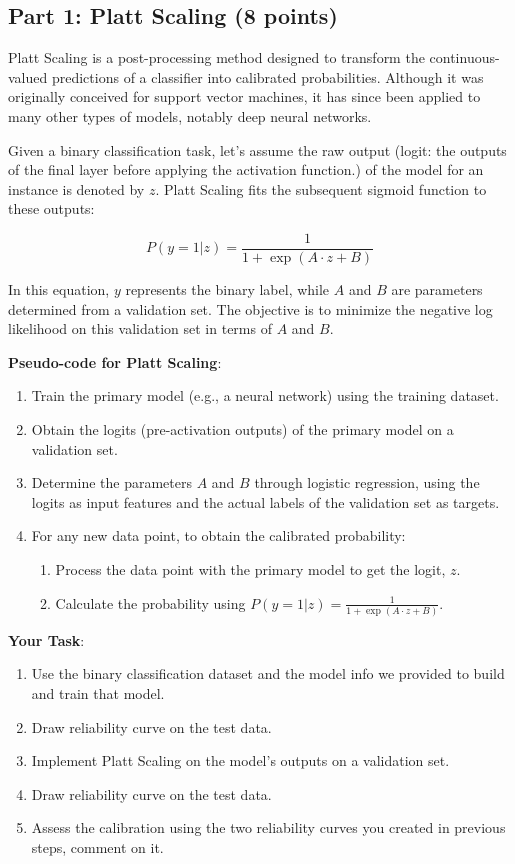 \documentclass[11pt, oneside]{article}   	%
\begin{document}
\subsection*{Part 1: Platt Scaling (8 points)}
Platt Scaling is a post-processing method designed to transform the continuous-valued predictions of a classifier into calibrated probabilities. Although it was originally conceived for support vector machines, it has since been applied to many other types of models, notably deep neural networks.

Given a binary classification task, let's assume the raw output (logit: the outputs of the final layer before applying the activation function.) of the model for an instance is denoted by \( z \). Platt Scaling fits the subsequent sigmoid function to these outputs:

\[
P(y=1|z) = \frac{1}{1 + \exp(A \cdot z + B)}
\]

In this equation, \( y \) represents the binary label, while \( A \) and \( B \) are parameters determined from a validation set. The objective is to minimize the negative log likelihood on this validation set in terms of \( A \) and \( B \).




\textbf{Pseudo-code for Platt Scaling}:

\begin{enumerate}
    \item Train the primary model (e.g., a neural network) using the training dataset.
    \item Obtain the logits (pre-activation outputs) of the primary model on a validation set.
    \item Determine the parameters \( A \) and \( B \) through logistic regression, using the logits as input features and the actual labels of the validation set as targets.
    \item For any new data point, to obtain the calibrated probability:
    \begin{enumerate}
        \item Process the data point with the primary model to get the logit, \( z \).
        \item Calculate the probability using \( P(y=1|z) = \frac{1}{1 + \exp(A \cdot z + B)} \).
    \end{enumerate}
\end{enumerate}

\textbf{Your Task}:
\begin{enumerate}
    \item Use the binary classification dataset and the model info we provided to build and train that model. 
    \item Draw reliability curve on the test data.
    \item Implement Platt Scaling on the model's outputs on a validation set.
    \item Draw reliability curve on the test data.
    \item Assess the calibration using the two reliability curves you created in previous steps, comment on it.
\end{enumerate}
\end{document}
